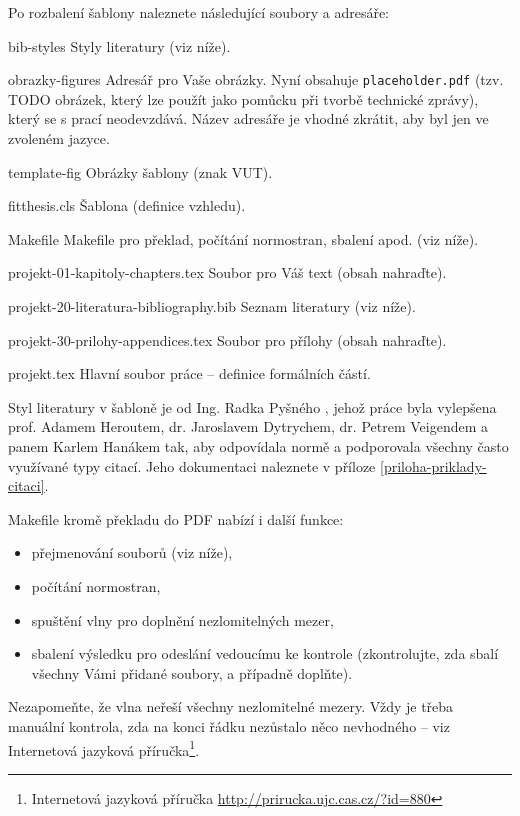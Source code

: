 Po rozbalení šablony naleznete následující soubory a adresáře:
\begin{DESCRIPTION}
  \item [bib-styles] Styly literatury (viz níže). 
  \item [obrazky-figures] Adresář pro Vaše obrázky. Nyní obsahuje \texttt{placeholder.pdf} (tzv. TODO obrázek, který lze použít jako pomůcku při tvorbě technické zprávy), který se s prací neodevzdává. Název adresáře je vhodné zkrátit, aby byl jen ve zvoleném jazyce.
  \item [template-fig] Obrázky šablony (znak VUT).
  \item [fitthesis.cls] Šablona (definice vzhledu).
  \item [Makefile] Makefile pro překlad, počítání normostran, sbalení apod. (viz níže).
  \item [projekt-01-kapitoly-chapters.tex] Soubor pro Váš text (obsah nahraďte).
  \item [projekt-20-literatura-bibliography.bib] Seznam literatury (viz níže).
  \item [projekt-30-prilohy-appendices.tex] Soubor pro přílohy (obsah nahraďte).
  \item [projekt.tex] Hlavní soubor práce -- definice formálních částí.
\end{DESCRIPTION}

Styl literatury v šabloně je od Ing. Radka Pyšného \cite{Pysny}, jehož práce byla vylepšena prof. Adamem Heroutem, dr. Jaroslavem Dytrychem, dr. Petrem Veigendem a panem Karlem Hanákem tak, aby odpovídala normě a podporovala všechny často využívané typy citací. Jeho dokumentaci naleznete v příloze \ref{priloha-priklady-citaci}.

\begin{samepage}
Makefile kromě překladu do PDF nabízí i další funkce:
\begin{itemize}
  \item přejmenování souborů (viz níže),
  \item počítání normostran,
  \item spuštění vlny pro doplnění nezlomitelných mezer,
  \item sbalení výsledku pro odeslání vedoucímu ke kontrole (zkontrolujte, zda sbalí všechny Vámi přidané soubory, a případně doplňte).
\end{itemize}
\end{samepage}

Nezapomeňte, že vlna neřeší všechny nezlomitelné mezery. Vždy je třeba manuální kontrola, zda na konci řádku nezůstalo něco nevhodného -- viz Internetová jazyková příručka\footnote{Internetová jazyková příručka \url{http://prirucka.ujc.cas.cz/?id=880}}.

